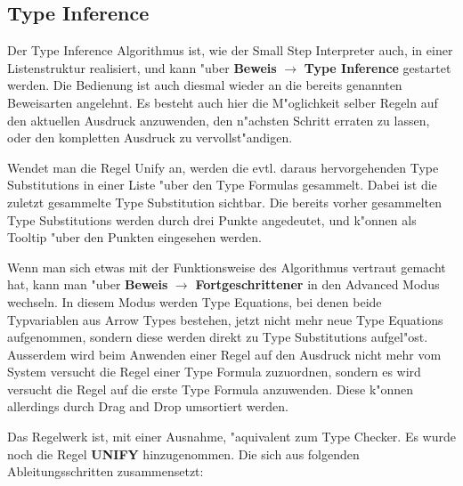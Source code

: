 \subsection{Type Inference}
Der Type Inference Algorithmus ist, wie der Small Step Interpreter 
auch, in einer Listenstruktur realisiert, und kann "uber {\bf Beweis} 
$\rightarrow$ {\bf Type Inference} gestartet werden. Die Bedienung ist auch diesmal 
wieder an die bereits genannten Beweisarten angelehnt. Es besteht 
auch hier die M"oglichkeit selber Regeln auf den aktuellen Ausdruck
anzuwenden, den n"achsten Schritt erraten zu lassen, oder den kompletten
Ausdruck zu vervollst"andigen.

Wendet man die Regel Unify an, werden die evtl. daraus hervorgehenden
Type Substitutions in einer Liste "uber den Type Formulas gesammelt. 
Dabei ist die zuletzt gesammelte Type Substitution sichtbar. Die bereits
vorher gesammelten Type Substitutions werden durch drei Punkte angedeutet,
und k"onnen als Tooltip "uber den Punkten eingesehen werden.

Wenn man sich etwas mit der Funktionsweise des Algorithmus vertraut gemacht hat,
kann man "uber {\bf Beweis} $\rightarrow$ {\bf Fortgeschrittener} in den 
Advanced Modus wechseln. In diesem Modus werden Type Equations, bei denen beide
Typvariablen aus Arrow Types bestehen, jetzt nicht mehr neue Type Equations
aufgenommen, sondern diese werden direkt zu Type Substitutions aufgel"ost.
Ausserdem wird beim Anwenden einer Regel auf den Ausdruck nicht mehr vom System
versucht die Regel einer Type Formula zuzuordnen, sondern es wird versucht die Regel
auf die erste Type Formula anzuwenden. Diese k"onnen allerdings durch Drag 
and Drop umsortiert werden.

Das Regelwerk ist, mit einer Ausnahme, "aquivalent zum Type Checker. Es wurde 
noch die Regel {\bf UNIFY} hinzugenommen. Die sich aus folgenden Ableitungsschritten
zusammensetzt:\\[4mm] 

